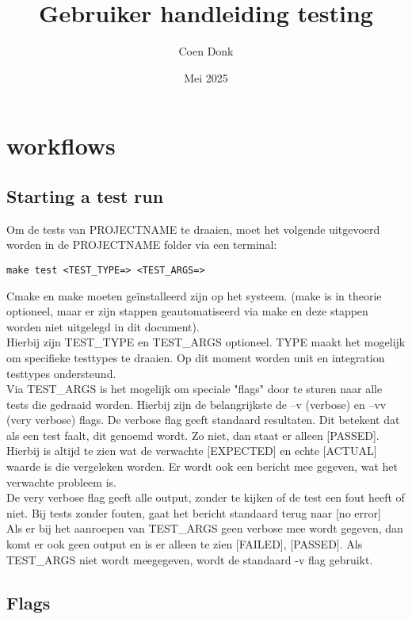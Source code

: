 \documentclass{article}
\title{Gebruiker handleiding testing}
\author{Coen Donk}
\date{Mei 2025}
\begin{document}
\maketitle

\section{workflows}
\subsection{Starting a test run}

Om de tests van PROJECTNAME te draaien, moet het volgende uitgevoerd worden in de PROJECTNAME folder via een terminal: 

\begin{lstlisting}[style=console]
    make test <TEST_TYPE=> <TEST_ARGS=> 
\end{lstlisting}

Cmake en make moeten geïnstalleerd zijn op het systeem. (make is in theorie optioneel, maar er zijn stappen geautomatiseerd via make en deze stappen worden niet uitgelegd in dit document).
\\
Hierbij zijn TEST\_TYPE en TEST\_ARGS optioneel. TYPE maakt het mogelijk om specifieke testtypes te draaien. Op dit moment worden unit en integration testtypes ondersteund. 
\\
Via TEST\_ARGS is het mogelijk om speciale "flags" door te sturen naar alle tests die gedraaid worden. Hierbij zijn de belangrijkste de --v (verbose) en --vv (very verbose) flags. De verbose flag geeft standaard resultaten. Dit betekent dat als een test faalt, dit genoemd wordt. Zo niet, dan staat er alleen [PASSED]. 
\\
Hierbij is altijd te zien wat de verwachte [EXPECTED] en echte [ACTUAL] waarde is die vergeleken worden. Er wordt ook een bericht mee gegeven, wat het verwachte probleem is. 
\\
De very verbose flag geeft alle output, zonder te kijken of de test een fout heeft of niet. Bij tests zonder fouten, gaat het bericht standaard terug naar [no error]
\\
Als er bij het aanroepen van TEST\_ARGS geen verbose mee wordt gegeven, dan komt er ook geen output en is er alleen te zien [FAILED], [PASSED].
Als TEST\_ARGS niet wordt meegegeven, wordt de standaard -v flag gebruikt. 
\newpage
\subsection{Flags}
\end{document}
